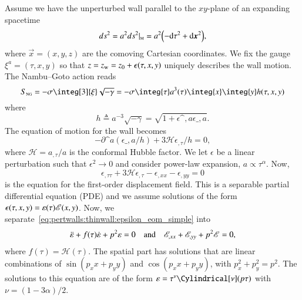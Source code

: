 Assume we have the unperturbed wall parallel to the $xy$-plane of an expanding spacetime
\begin{equation}
    {ds}^2 = a^2 {ds}^2\rvert\nped{M} = a^2 \pclosed{- {\diff \tau}^2 + {\diff \vec{x}}^2  }, 
\end{equation}
where $\vec{x}=(x,y,z)$ are the comoving Cartesian coordinates. %
We fix the gauge $ \xi^a = (\tau, x, y)$ so that $z=z_\mathrm{w}=z_0+\epsilon(\tau, x, y) $ uniquely describes the wall motion. 
The Nambu--Goto action reads
\begin{equation}\label{eq:pertwalls:thinwall:Nambu_Goto_action_dw_FLRW}
    S\nped{NG} = -\sigma \integ[3]{\xi} \sqrt{-\gamma} = - \sigma \integ{\tau}a^3(\tau)\integ{x}\integ{y}  h(\tau,x,y)
\end{equation}
where 
\begin{equation}
    h \triangleq a^{-3}\sqrt{-\gamma}%
    = \sqrt{1 + \epsilon\^{,a}\epsilon\_{,a} }.
\end{equation}
The equation of motion for the wall becomes~\citep{vilenkinCosmicStringsOther1994}
\begin{equation}\label{eq:pertwalls:thinwall:eom_domain_wall_FLRW}
    -\partial\^a ( \epsilon\_{,a}/h) + 3 \mathcal{H} \epsilon_{,\tau} /h = 0,
\end{equation}
where $\mathcal{H}= a_{,\tau}/a$ is the conformal Hubble factor. %
We let $\epsilon$ be a linear perturbation such that $\epsilon^2 \to 0$ %
and consider power-law expansion, $a\propto \tau^\alpha$. 
Now,
\begin{equation}\label{eq:pertwalls:thinwall:epsilon_eom_simple}
    \epsilon_{,\tau\tau} + 3\mathcal{H} \epsilon_{,\tau} - \epsilon_{,xx} - \epsilon_{,yy} = 0
\end{equation}
is the equation for the first-order displacement field. %
This is a separable partial differential equation (PDE) and we assume solutions of the form $\epsilon(\tau, x, y) = \varepsilon(\tau)\mathscr{E}(x,y)$. Now, we separate~\cref{eq:pertwalls:thinwall:epsilon_eom_simple} into
\begin{align}\label{eq:pertwalls:thinwall:varepsilon_and_E_eoms}
    \ddot{\varepsilon} + f(\tau) \dot{\varepsilon} + p^2 \varepsilon = 0 \quad\text{and}\quad  \mathscr{E}_{,xx} + \mathscr{E}_{,yy} + p^2 \mathscr{E} = 0,
\end{align}
where $f(\tau) = \mathcal{H}(\tau)$. %
The spatial part has solutions that are linear combinations of $\sin{(p_x x+p_y y)}$ and $\cos{(p_x x+p_y y)}$, with $p_x^2+p_y^2 = p^2$. %
The solutions to this equation are of the form $\varepsilon = \tau^\nu \Cylindrical[\nu](p\tau)$ with $ \nu=(1-3\alpha)/2$.



